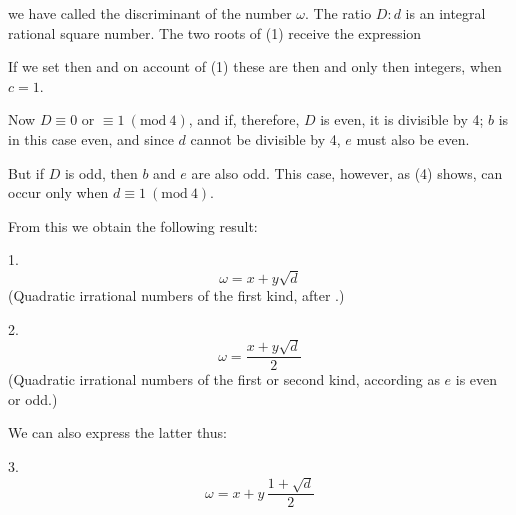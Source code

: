 we have called the discriminant of the number $\omega$. The ratio $D:d$ is an integral rational square number. The two roots of (1) receive the expression

If we set
then
and on account of (1) these are then and only then integers, when $c=1$.

Now $D\equiv 0$ or $\equiv 1\ (\mathrm{mod}\ 4)$, and if, therefore, $D$ is even, it is divisible by 4; $b$ is in this case even, and since $d$ cannot be divisible by 4, $e$ must also be even.

But if $D$ is odd, then $b$ and $e$ are also odd. This case, however, as (4) shows, can occur only when $d\equiv 1\ (\mathrm{mod}\ 4)$.

From this we obtain the following result:

1. 
\[ \omega = x + y\sqrt{d} \]
 (Quadratic irrational numbers of the first kind, after .)

2. 
\[ \omega = \frac{x+y\sqrt{d}}{2} \]
 (Quadratic irrational numbers of the first or second kind, according as $e$ is even or odd.)

We can also express the latter thus:

3. 
\[ \omega = x + y\,\frac{1+\sqrt{d}}{2} \]

